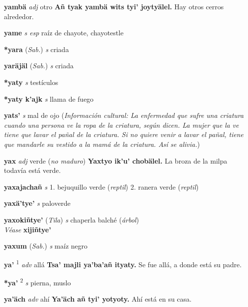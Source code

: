 \documentclass[10pt]{scrbook}
\newcommand{\entry}[1]{\textbf{#1}}
\newcommand{\onedefinition}[1]{#1.}
\newcommand{\defsuperscript}[1]{\textsuperscript{#1}}
\newcommand{\partofspeech}[1]{\textit{#1}}
\newcommand{\spanishtranslation}[1]{#1}
\newcommand{\clarification}[1]{(\textit{#1})}
\newcommand{\cholexample}[1]{\textbf{#1}}
\newcommand{\exampletranslation}[1]{#1}
\newcommand{\alsosee}[1]{\\\textit{Véase} \textbf{#1}}
\newcommand{\relevantdialect}[1]{(\textit{#1})}
\newcommand{\culturalinformation}[1]{(\textit{#1})}
\begin{document}
\begin{multicols}{2}
\entry{yambä}
\partofspeech{adj}
\spanishtranslation{otro}
\cholexample{Añ tyak yambä wits tyi' joytyälel.}
\exampletranslation{Hay otros cerros alrededor.}

\entry{yame}
\partofspeech{s esp}
\spanishtranslation{raíz de chayote, chayotestle}

\entry{*yara}
\relevantdialect{Sab.}
\partofspeech{s}
\spanishtranslation{criada}

\entry{yaräjäl}
\relevantdialect{Sab.}
\partofspeech{s}
\spanishtranslation{criada}

\entry{*yaty}
\partofspeech{s}
\spanishtranslation{testículos}

\entry{*yaty k'ajk}
\partofspeech{s}
\spanishtranslation{llama de fuego}

\entry{yats'}
\partofspeech{s}
\spanishtranslation{mal de ojo}
\culturalinformation{Información cultural: La enfermedad que sufre una criatura cuando una persona ve la ropa de la criatura, según dicen. La mujer que la ve tiene que lavar el pañal de la criatura. Si no quiere venir a lavar el pañal, tiene que mandarle su vestido a la mamá de la criatura. Así se alivia.}

\entry{yax}
\partofspeech{adj}
\spanishtranslation{verde}
\clarification{no maduro}
\cholexample{Yaxtyo ik'u' chobälel.}
\exampletranslation{La broza de la milpa todavía está verde.}

\entry{yaxajachañ}
\partofspeech{s}
\onedefinition{1}
\spanishtranslation{bejuquillo verde}
\clarification{reptil}
\onedefinition{2}
\spanishtranslation{ranera verde}
\clarification{reptil}

\entry{yaxä'tye'}
\partofspeech{s}
\spanishtranslation{paloverde}

\entry{yaxokiñtye'}
\relevantdialect{Tila}
\partofspeech{s}
\spanishtranslation{chaperla}
\spanishtranslation{balché}
\clarification{árbol}
\alsosee{xijiñtye'}

\entry{yaxum}
\relevantdialect{Sab.}
\partofspeech{s}
\spanishtranslation{maíz negro}

\entry{ya'}
\defsuperscript{1}
\partofspeech{adv}
\spanishtranslation{allá}
\cholexample{Tsa' majli ya'ba'añ ityaty.}
\exampletranslation{Se fue allá, a donde está su padre.}

\entry{*ya'}
\defsuperscript{2}
\partofspeech{s}
\spanishtranslation{pierna, muslo}

\entry{ya'äch}
\partofspeech{adv}
\spanishtranslation{ahí}
\cholexample{Ya'äch añ tyi' yotyoty.}
\exampletranslation{Ahí está en su casa.}


\end{multicols}
\end{document}
